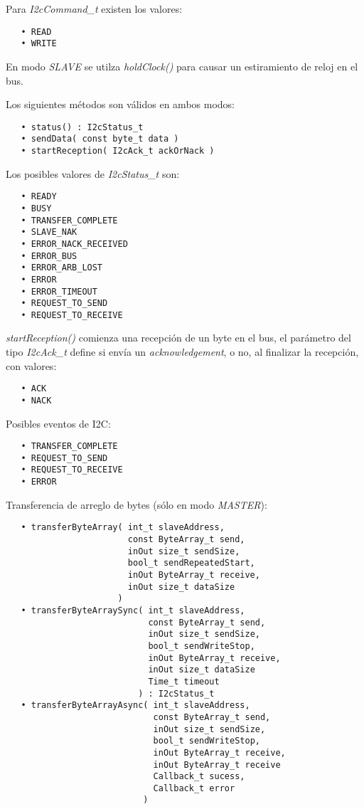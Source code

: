 Para \emph{I2cCommand\_t} existen los valores:

\begin{verbatim}
   • READ
   • WRITE
\end{verbatim}

En modo \emph{SLAVE} se utilza \emph{holdClock()} para causar un estiramiento de reloj en el bus.

Los siguientes métodos son válidos en ambos modos:

\begin{verbatim}
   • status() : I2cStatus_t
   • sendData( const byte_t data )
   • startReception( I2cAck_t ackOrNack )
\end{verbatim}

Los posibles valores de \emph{I2cStatus\_t} son:

\begin{verbatim}
   • READY
   • BUSY
   • TRANSFER_COMPLETE
   • SLAVE_NAK 
   • ERROR_NACK_RECEIVED
   • ERROR_BUS
   • ERROR_ARB_LOST
   • ERROR
   • ERROR_TIMEOUT
   • REQUEST_TO_SEND
   • REQUEST_TO_RECEIVE
\end{verbatim}

\emph{startReception()} comienza una recepción de un byte en el bus, el parámetro del tipo \emph{I2cAck\_t} define si envía un \emph{acknowledgement}, o no, al finalizar la recepción, con valores:

\begin{verbatim}
   • ACK
   • NACK
\end{verbatim}

Posibles eventos de I2C:

\begin{verbatim}
   • TRANSFER_COMPLETE
   • REQUEST_TO_SEND
   • REQUEST_TO_RECEIVE
   • ERROR
\end{verbatim}


Transferencia de arreglo de bytes (sólo en modo \emph{MASTER}):

\begin{verbatim}
   • transferByteArray( int_t slaveAddress,
                        const ByteArray_t send,
                        inOut size_t sendSize,
                        bool_t sendRepeatedStart,
                        inOut ByteArray_t receive,
                        inOut size_t dataSize
                      )
   • transferByteArraySync( int_t slaveAddress,
                            const ByteArray_t send,
                            inOut size_t sendSize,
                            bool_t sendWriteStop,
                            inOut ByteArray_t receive,
                            inOut size_t dataSize
                            Time_t timeout
                          ) : I2cStatus_t
   • transferByteArrayAsync( int_t slaveAddress,
                             const ByteArray_t send,
                             inOut size_t sendSize,
                             bool_t sendWriteStop,
                             inOut ByteArray_t receive,
                             inOut ByteArray_t receive
                             Callback_t sucess,
                             Callback_t error 
                           )
\end{verbatim}

